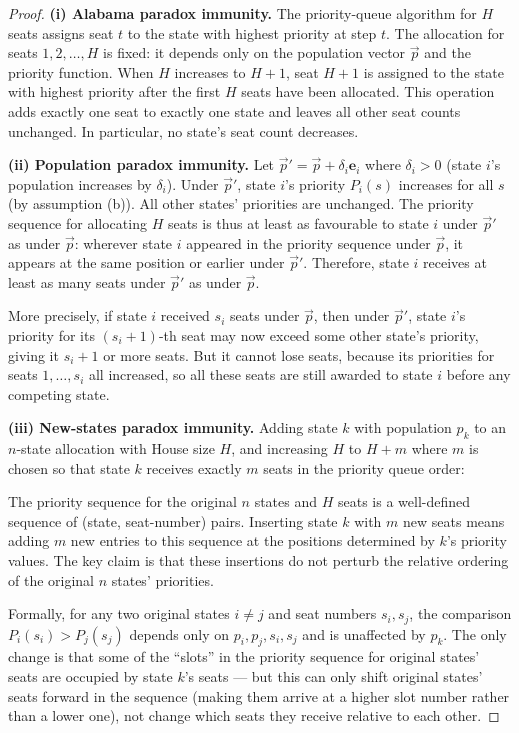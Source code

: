 \begin{proof}
  \textbf{(i) Alabama paradox immunity.}
  The priority-queue algorithm for $H$ seats assigns seat $t$ to the
  state with highest priority at step $t$.
  The allocation for seats $1, 2, \ldots, H$ is fixed: it depends
  only on the population vector $\vec{p}$ and the priority function.
  When $H$ increases to $H+1$, seat $H+1$ is assigned to the state
  with highest priority after the first $H$ seats have been allocated.
  This operation adds exactly one seat to exactly one state and
  leaves all other seat counts unchanged.
  In particular, no state's seat count decreases.

  \textbf{(ii) Population paradox immunity.}
  Let $\vec{p}' = \vec{p} + \delta_i \mathbf{e}_i$ where $\delta_i > 0$
  (state $i$'s population increases by $\delta_i$).
  Under $\vec{p}'$, state $i$'s priority $P_i(s)$ increases for all $s$
  (by assumption (b)).
  All other states' priorities are unchanged.
  The priority sequence for allocating $H$ seats is thus at least as
  favourable to state $i$ under $\vec{p}'$ as under $\vec{p}$:
  wherever state $i$ appeared in the priority sequence under $\vec{p}$,
  it appears at the same position or earlier under $\vec{p}'$.
  Therefore, state $i$ receives at least as many seats under $\vec{p}'$
  as under $\vec{p}$.

  More precisely, if state $i$ received $s_i$ seats under $\vec{p}$,
  then under $\vec{p}'$, state $i$'s priority for its $(s_i+1)$-th seat
  may now exceed some other state's priority, giving it $s_i+1$ or more
  seats.
  But it cannot lose seats, because its priorities for seats
  $1, \ldots, s_i$ all increased, so all these seats are still
  awarded to state $i$ before any competing state.

  \textbf{(iii) New-states paradox immunity.}
  Adding state $k$ with population $p_k$ to an $n$-state allocation
  with House size $H$, and increasing $H$ to $H + m$ where
  $m$ is chosen so that state $k$ receives exactly $m$ seats
  in the priority queue order:

  The priority sequence for the original $n$ states and $H$ seats
  is a well-defined sequence of (state, seat-number) pairs.
  Inserting state $k$ with $m$ new seats means adding $m$ new entries
  to this sequence at the positions determined by $k$'s priority values.
  The key claim is that these insertions do not perturb the relative
  ordering of the original $n$ states' priorities.

  Formally, for any two original states $i \neq j$ and seat numbers
  $s_i, s_j$, the comparison $P_i(s_i) > P_j(s_j)$ depends only on
  $p_i, p_j, s_i, s_j$ and is unaffected by $p_k$.
  The only change is that some of the ``slots'' in the priority
  sequence for original states' seats are occupied by state $k$'s
  seats --- but this can only shift original states' seats forward
  in the sequence (making them arrive at a higher slot number
  rather than a lower one), not change which seats they receive
  relative to each other.


\end{proof}
